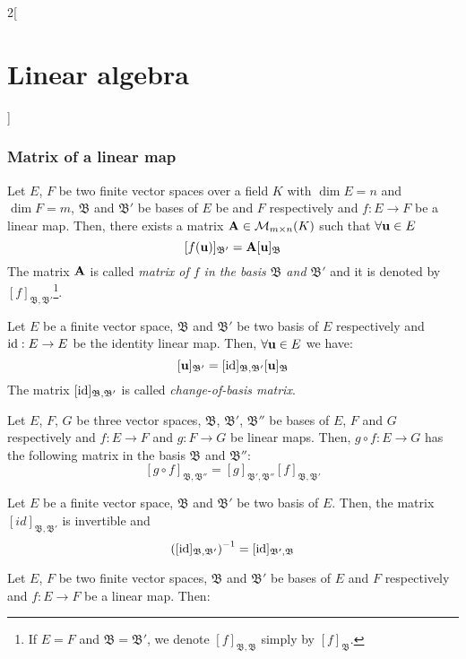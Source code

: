 \documentclass[../../../main.tex]{subfiles}
\begin{document}
\begin{multicols}{2}[\section{Linear algebra}]
\subsubsection*{Matrix of a linear map}
\begin{prop}
    Let $E$, $F$ be two finite vector spaces over a field $K$ with $\dim E=n$ and $\dim F=m$, $\mathfrak{B}$ and $\mathfrak{B}'$ be bases of $E$ be and $F$ respectively and $f:E\rightarrow F$ be a linear map. Then, there exists a matrix $\vb{A}\in\mathcal{M}_{m\times n}(K)$ such that $\forall\vb{u}\in E$ $$[f(\vb{u})]_{\mathfrak{B}'}=\vb{A}[\vb{u}]_\mathfrak{B}$$
    The matrix $\vb{A}$ is called \textit{matrix of $f$ in the basis $\mathfrak{B}$ and $\mathfrak{B}'$} and it is denoted by $[f]_{\mathfrak{B},\mathfrak{B}'}$\footnote{If $E=F$ and $\mathfrak{B}=\mathfrak{B}'$, we denote $[f]_{\mathfrak{B},\mathfrak{B}}$ simply by $[f]_{\mathfrak{B}}$.}. 
\end{prop}
\begin{corollary}
    Let $E$ be a finite vector space, $\mathfrak{B}$ and $\mathfrak{B}'$ be two basis of $E$ respectively and $\mathrm{id}:E\rightarrow E$ be the identity linear map. Then, $\forall\vb{u}\in E$ we have: $$[\vb{u}]_{\mathfrak{B}'}=[\mathrm{id}]_{\mathfrak{B},\mathfrak{B}'}[\vb{u}]_\mathfrak{B}$$ The matrix $[\mathrm{id}]_{\mathfrak{B},\mathfrak{B}'}$ is called \textit{change-of-basis matrix}. 
\end{corollary}
\begin{prop}
    Let $E$, $F$, $G$ be three vector spaces, $\mathfrak{B}$, $\mathfrak{B}'$, $\mathfrak{B}''$ be bases of $E$, $F$ and $G$ respectively and $f:E\rightarrow F$ and $g:F\rightarrow G$ be linear maps. Then, $g\circ f:E\rightarrow G$ has the following matrix in the basis $\mathfrak{B}$ and $\mathfrak{B}''$: $$[g\circ f]_{\mathfrak{B},\mathfrak{B}''}=[g]_{\mathfrak{B}',\mathfrak{B}''}[f]_{\mathfrak{B},\mathfrak{B}'}$$ 
\end{prop}
\begin{corollary}
    Let $E$ be a finite vector space, $\mathfrak{B}$ and $\mathfrak{B}'$ be two basis of $E$. Then, the matrix $[id]_{\mathfrak{B},\mathfrak{B}'}$ is invertible and $${\left([\mathrm{id}]_{\mathfrak{B},\mathfrak{B}'}\right)}^{-1}=[\mathrm{id}]_{\mathfrak{B}',\mathfrak{B}}$$
\end{corollary}
\begin{corollary}
    Let $E$, $F$ be two finite vector spaces, $\mathfrak{B}$ and $\mathfrak{B}'$ be bases of $E$ and $F$ respectively and $f:E\rightarrow F$ be a linear map. Then:

\end{corollary}
\end{multicols}
\end{document}
